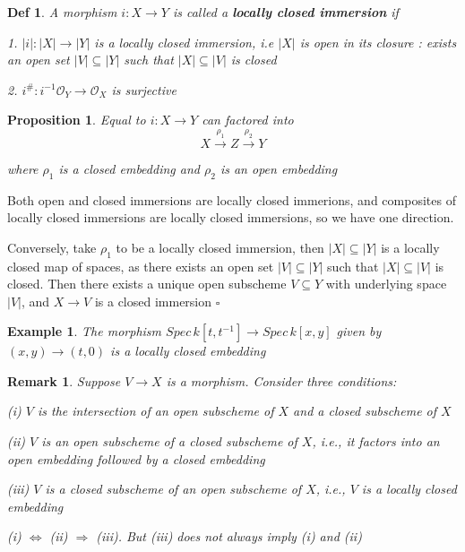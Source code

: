 \documentclass{article}
\newtheorem{definition}[theorem]{Def}
\newtheorem{example}[theorem]{Example}
\newtheorem{proposition}[theorem]{Proposition}
\newtheorem{remark}[theorem]{Remark}
\newenvironment{Proof}{{\noindent \indent \it Proof:\quad}}{\hfill $\square$\par}
\begin{document}
\begin{definition}
    A morphism $i : X \to Y$ is called a \textbf{locally closed immersion} if
    
1. $|i| : |X| \to |Y |$ is a locally closed immersion, i.e $|X|$ is open in its closure : exists an open set $|V| \subseteq |Y|$
such that $|X| \subseteq |V|$ is closed

2. $i^{\#} : i^{-1}\mathcal O_Y \to \mathcal O_X$ is surjective
\end{definition}

\begin{proposition}
    Equal to $i: X \to Y$ can factored into
    $$
    X
    \xrightarrow{\rho_1}
    Z
    \xrightarrow{\rho_2}
    Y
    $$

where $\rho_1$ is a closed embedding and $\rho_2$ is an open embedding
\end{proposition}
\begin{Proof}
Both open and closed immersions are locally closed immerions, and composites of locally closed
immersions are locally closed immersions, so we have one direction.

Conversely, take $\rho_1$ to be a locally
closed immersion, then $|X| \subseteq |Y|$ is a locally closed map of spaces, as there exists an open set $|V| \subseteq |Y|$
such that $|X| \subseteq |V|$ is closed. Then there exists a unique open subscheme $V \subseteq Y$ with underlying
space $|V|$, and $X \to V$ is a closed immersion
\end{Proof}

\begin{example}
The morphism $Spec\, k[t, t^{-1}] \to Spec\, k[x, y]$ given by $(x, y) \to (t, 0)$ is a locally closed
embedding
\end{example}

\begin{remark}
Suppose $V \to X$ is a morphism. Consider three conditions:

(i) $V$ is the intersection of an open subscheme of $X$ and a closed subscheme
of $X$

(ii) $V$ is an open subscheme of a closed subscheme of $X$, i.e., it factors into an open embedding followed by a closed embedding

(iii) $V$ is a closed subscheme of an open subscheme of $X$, i.e., $V$ is a locally
closed embedding

(i) $\Leftrightarrow$ (ii) $\Rightarrow$ (iii). But (iii) does not always imply (i) and (ii)
\end{remark}
\end{document}
